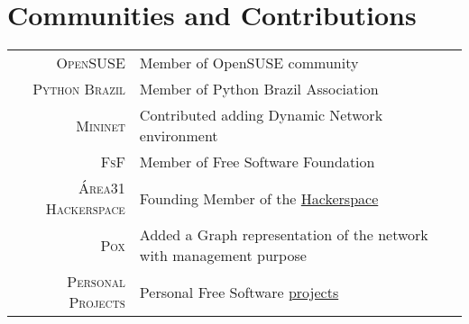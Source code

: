 \documentclass[a4paper,10pt]{article} %
\begin{document}

\section{Communities and Contributions}

\begin{tabular}{rl}
\textsc{OpenSUSE}  & Member of OpenSUSE community \\
\textsc{Python Brazil}  & Member of Python Brazil Association \\
\textsc{Mininet}  & Contributed adding Dynamic Network environment \\
\textsc{FsF} & Member of Free Software Foundation \\
\textsc{Área31 Hackerspace} & Founding Member of the
\href{http://area31.net.br}{Hackerspace} \\
\textsc{Pox} & Added a Graph representation of the network with 
management purpose \\
\textsc{Personal Projects} & Personal Free Software
\href{http://github.com/pantuza}{projects} \\
\end{tabular}












\end{document}
